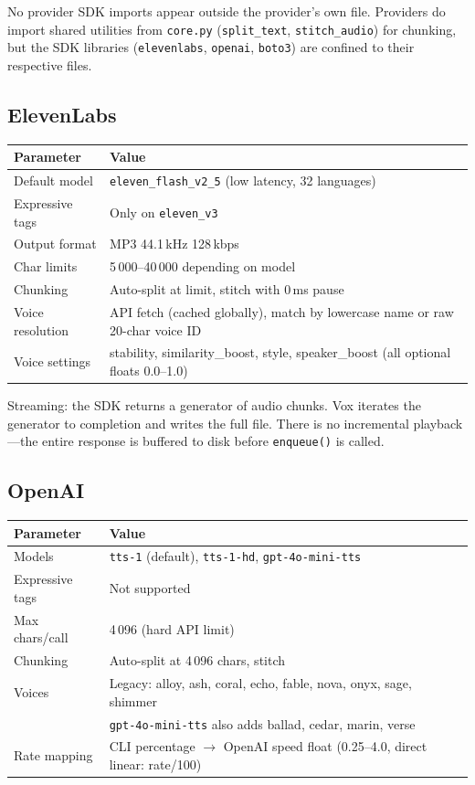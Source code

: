 \documentclass[a4paper,10pt]{article}
\begin{document}
No provider SDK imports appear outside the provider's own file.
Providers do import shared utilities from \texttt{core.py}
(\texttt{split\_text}, \texttt{stitch\_audio}) for chunking, but
the SDK libraries (\texttt{elevenlabs}, \texttt{openai},
\texttt{boto3}) are confined to their respective files.

\subsection{ElevenLabs}

\begin{center}
\begin{tabular}{ll}
\toprule
\textbf{Parameter} & \textbf{Value} \\
\midrule
Default model   & \texttt{eleven\_flash\_v2\_5} (low latency, 32 languages) \\
Expressive tags & Only on \texttt{eleven\_v3} \\
Output format   & MP3 44.1\,kHz 128\,kbps \\
Char limits     & 5\,000--40\,000 depending on model \\
Chunking        & Auto-split at limit, stitch with 0\,ms pause \\
Voice resolution & API fetch (cached globally), match by lowercase name
  or raw 20-char voice ID \\
Voice settings  & stability, similarity\_boost, style, speaker\_boost
  (all optional floats 0.0--1.0) \\
\bottomrule
\end{tabular}
\end{center}

Streaming: the SDK returns a generator of audio chunks.  Vox
iterates the generator to completion and writes the full file.
There is no incremental playback---the entire response is
buffered to disk before \texttt{enqueue()} is called.

\subsection{OpenAI}

\begin{center}
\begin{tabular}{ll}
\toprule
\textbf{Parameter} & \textbf{Value} \\
\midrule
Models          & \texttt{tts-1} (default), \texttt{tts-1-hd}, \texttt{gpt-4o-mini-tts} \\
Expressive tags & Not supported \\
Max chars/call  & 4\,096 (hard API limit) \\
Chunking        & Auto-split at 4\,096 chars, stitch \\
Voices          & Legacy: alloy, ash, coral, echo, fable, nova, onyx, sage, shimmer \\
                & \texttt{gpt-4o-mini-tts} also adds ballad, cedar, marin, verse \\
Rate mapping    & CLI percentage $\to$ OpenAI speed float
  (0.25--4.0, direct linear: rate/100) \\
\bottomrule
\end{tabular}
\end{center}
\end{document}
